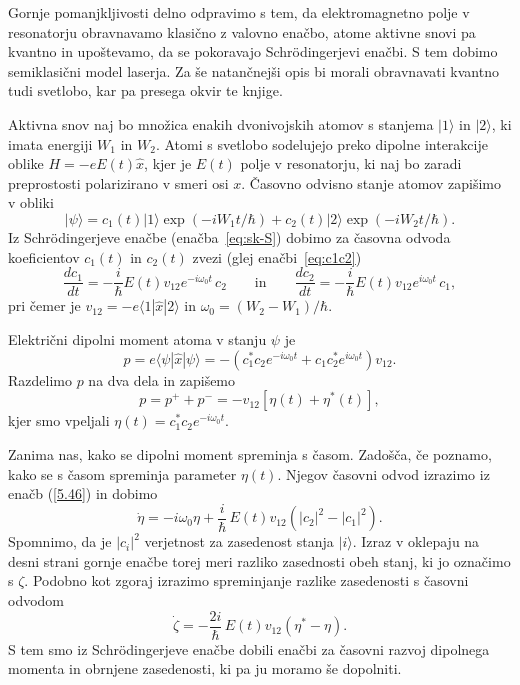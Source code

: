 Gornje pomanjkljivosti delno odpravimo s tem, da elektromagnetno polje v
resonatorju obravnavamo klasično z valovno enačbo, atome aktivne snovi pa
kvantno in upoštevamo, da se pokoravajo Schr\"odingerjevi enačbi. S tem dobimo 
semiklasični model laserja. Za še natančnejši opis bi morali obravnavati
kvantno tudi svetlobo, kar pa presega okvir te knjige.

Aktivna snov naj bo množica enakih dvonivojskih 
atomov s stanjema $|1\rangle$ in $|2\rangle$, ki imata energiji $W_1$ in $W_2$.
Atomi s svetlobo sodelujejo preko dipolne interakcije oblike $H = -eE(t)\hat{x}$, 
kjer je $E(t)$ polje v resonatorju, ki naj bo zaradi preprostosti 
polarizirano v smeri osi $x$. Časovno odvisno stanje atomov
zapišimo v obliki 
\begin{equation}  \label{5.45}
|\psi\rangle=c_1(t)|1\rangle\exp(-iW_1t/\hbar)+
c_2(t)|2\rangle\exp(-iW_2t/\hbar).
\end{equation}
Iz Schr\"odingerjeve enačbe (enačba~\ref{eq:sk-S}) dobimo za časovna odvoda
koeficientov $c_1(t)$ in $c_2(t)$ zvezi
(glej enačbi~\ref{eq:c1c2})
\begin{equation}
\frac{d c_1}{dt}=-\frac{i}{\hbar} E(t)v_{12} e^{-i\omega_0 t}\, c_2 
\qquad \mathrm{in} \qquad
\frac{d c_2}{dt}=-\frac{i}{\hbar} E(t)v_{12} e^{i\omega_0 t}\, c_1,
\label{5.46}
\end{equation}
pri čemer je $v_{12} = -e\langle1|\hat{x}|2\rangle$ in $\omega_0=(W_2-W_1)/\hbar$.

Električni dipolni moment atoma v stanju ${\psi}$ je 
\begin{equation}  
\label{5.47}
p=e\langle\psi|\hat{x}|\psi\rangle=-
(c_1^{\ast}c_2e^{-i \omega_0t}+c_1c_2^{\ast}e^{i \omega_0 t}) v_{12}.
\end{equation}
Razdelimo $p$ na dva dela in zapišemo
\begin{equation}  
\label{5.48}
p=p^+ + p^-=-v_{12}[\eta(t)+\eta^{\ast}(t)],
\end{equation}
kjer smo vpeljali $\eta(t)=c_1^{\ast}c_2e^{-i \omega_0 t}$.

Zanima nas, kako se dipolni moment spreminja s časom. Zadošča, če poznamo, kako se 
s časom spreminja parameter $\eta(t)$. Njegov časovni odvod izrazimo
iz enačb (\ref{5.46}) in dobimo
\begin{equation}  
\label{5.49}
\dot{\eta}=- i \omega_0\eta+\frac{i}{\hbar}\,E(t)v_{12} \left(|c_2|^2-|c_1|^2\right).
\end{equation}
Spomnimo, da je $|c_i|^2$ verjetnost za zasedenost stanja $|i\rangle$. Izraz v oklepaju
na desni strani gornje enačbe torej meri razliko zasednosti obeh stanj, ki jo označimo
s $\zeta$. Podobno kot zgoraj izrazimo spreminjanje razlike zasedenosti s časovni odvodom 
\begin{equation}  
\label{5.50}
\dot{\zeta}=-\frac{2i}{\hbar}\, E(t)v_{12}\left(\eta^{\ast}- \eta\right).
\end{equation}
S tem smo iz Schr\"odingerjeve enačbe dobili enačbi za časovni razvoj
dipolnega momenta in obrnjene zasedenosti, ki pa ju moramo še dopolniti.

